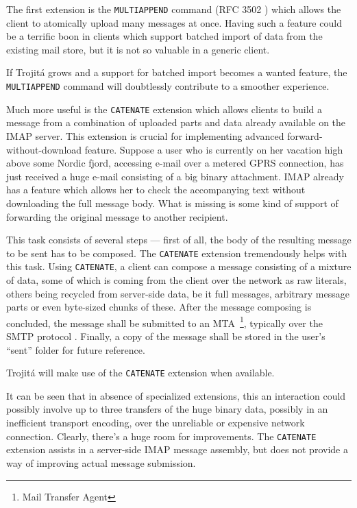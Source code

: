 \documentclass[trojita]{subfiles}
\begin{document}
The first extension is the {\tt MULTIAPPEND} command (RFC 3502 \cite{rfc3502}) which allows the client to atomically
upload many messages at once.  Having such a feature could be a terrific boon in clients which support batched import of
data from the existing mail store, but it is not so valuable in a generic client.

\begin{trojitabehavior}
If Trojitá grows and a support for batched import becomes a wanted feature, the {\tt MULTIAPPEND} command will
doubtlessly contribute to a smoother experience.
\end{trojitabehavior}

Much more useful is the {\tt CATENATE} extension \cite{rfc4469} which allows clients to build a message from a
combination of uploaded parts and data already available on the IMAP server.  This extension is crucial for implementing
advanced forward-without-download feature.  Suppose a user who is currently on her vacation high above some Nordic
fjord, accessing e-mail over a metered GPRS connection, has just received a huge e-mail consisting of a big binary
attachment.  IMAP already has a feature which allows her to check the accompanying text without downloading the full
message body.  What is missing is some kind of support of forwarding the original message to another recipient.

This task consists of several steps --- first of all, the body of the resulting message to be sent has to be composed.
The {\tt CATENATE} extension tremendously helps with this task.  Using {\tt CATENATE}, a client can compose a message
consisting of a mixture of data, some of which is coming from the client over the network as raw literals, others being
recycled from server-side data, be it full messages, arbitrary message parts or even byte-sized chunks of these.  After
the message composing is concluded, the message shall be submitted to an MTA~\footnote{Mail Transfer Agent}, typically
over the SMTP protocol \cite{rfc6409}.  Finally, a copy of the message shall be stored in the user's ``sent'' folder for
future reference.

\begin{trojitabehavior}
Trojitá will make use of the {\tt CATENATE} extension when available.
\end{trojitabehavior}

It can be seen that in absence of specialized extensions, this an interaction could possibly involve up to three
transfers of the huge binary data, possibly in an inefficient transport encoding, over the unreliable or expensive
network connection.  Clearly, there's a huge room for improvements.  The {\tt CATENATE} extension assists in a
server-side IMAP message assembly, but does not provide a way of improving actual message submission.
\end{document}
